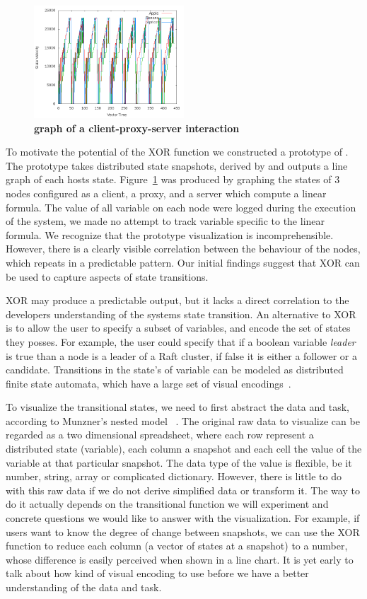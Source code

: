 \begin{figure}[t]
    \includegraphics[width=0.50\textwidth]{fig/plot}
    \caption{\textbf{\dviz graph of a client-proxy-server interaction}}
\label{fig:plot} 
\end{figure}

To motivate the potential of the XOR function we constructed a prototype of \dviz. The prototype takes distributed state snapshots, derived by \dinv and outputs a line graph of each hosts state. Figure~\ref{fig:plot} was produced by graphing the states of 3 nodes configured as a client, a proxy, and a server which compute a linear formula. The value of all variable on each node were logged during the execution of the system, we made no attempt to track variable specific to the linear formula. We recognize that the prototype visualization is incomprehensible. However, there is a clearly visible correlation between the behaviour of the nodes, which repeats in a predictable pattern. Our initial findings suggest that XOR can be used to capture aspects of state transitions.

XOR may produce a predictable output, but it lacks a direct correlation to the developers understanding of the systems state transition. An alternative to XOR is to allow the user to specify a subset of variables, and encode the set of states they posses. For example, the user could specify that if a boolean variable \textit{leader} is true than a node is a leader of a Raft cluster, if false it is either a follower or a candidate. Transitions in the state's of variable can be modeled as distributed finite state automata, which have a large set of visual encodings~\cite{DBLP:journals/corr/abs-1110-4161}.


To visualize the transitional states, we need to first abstract the 
data and task, according to Munzner's nested model ~\cite{munzner2009nested}.
The original raw data to visualize can be regarded as a two dimensional 
spreadsheet, where each row represent a distributed state (variable),
 each column a snapshot and each cell the value of the variable at
 that particular snapshot.  The data type of the value is flexible,
 be it number, string, array or complicated dictionary.
However, there is little to do with this raw data if we do not derive
simplified data or transform it.  The way to do it actually depends on 
the transitional function we will experiment and concrete questions we
would like to answer with the visualization.  For example, if users want
to know the degree of change between snapshots, we can use the XOR function
to reduce each column (a vector of states at a snapshot) to a number,
whose difference is easily perceived when shown in a line chart.
It is yet early to talk about how kind of visual encoding to use before
we have a better understanding of the data and task.
